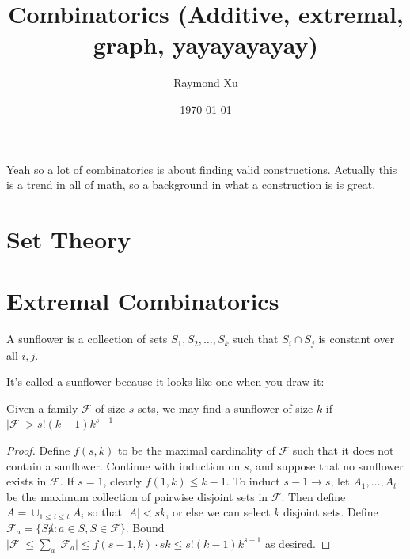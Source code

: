 \documentclass[11pt]{scrartcl}
\theoremstyle{plain} %
\theoremstyle{definition}
\theoremstyle{remark}
\theoremstyle{empty}
\theoremstyle{empty}
\theoremstyle{empty}
\theoremstyle{empty}
\theoremstyle{empty}
\theoremstyle{empty}
\theoremstyle{empty}
\theoremstyle{empty}
\begin{document}



\title{Combinatorics (Additive, extremal, graph, yayayayayay)}
\author{Raymond Xu}
\date{\today}
\maketitle

\begin{abstract}
\end{abstract}

\tableofcontents

\eject

Yeah so a lot of combinatorics is about finding valid constructions. Actually this is a trend in all of math, so a background in what a construction is is great. 

\section{Set Theory}

\section{Extremal Combinatorics}

\begin{definition}[Sunflower]
    A sunflower is a collection of sets $S_1, S_2, \ldots, S_k$ such that $S_i \cap S_j$ is constant over all $i,j$. 
\end{definition}

It's called a sunflower because it looks like one when you draw it: 

\begin{theorem}
    Given a family $\mathcal F$ of size $s$ sets, we may find a sunflower of size $k$ if $|\mathcal F| > s!(k-1)k^{s-1}$
\end{theorem}

\begin{proof}
  Define $f(s,k)$ to be the maximal cardinality of $\mathcal F$ such that it does not contain a sunflower. Continue with induction on $s$, and suppose that no sunflower exists in $\mathcal F$. If $s=1$, clearly $f(1, k) \le k-1$. To induct $s-1 \to s$, let $A_1, \ldots, A_t$ be the maximum collection of pairwise disjoint sets in $\mathcal F$. Then define $A = \cup_{1 \le i \le t} A_i$ so that $|A| < sk$, or else we can select $k$ disjoint sets. Define $\mathcal F_a = \{S\not a : a \in S, S \in \mathcal F\}$. Bound $|\mathcal F| \le \sum_a |\mathcal F_a| \le f(s-1, k)\cdot sk \le s!(k-1)k^{s-1}$ as desired. 
\end{proof}
\end{document}
